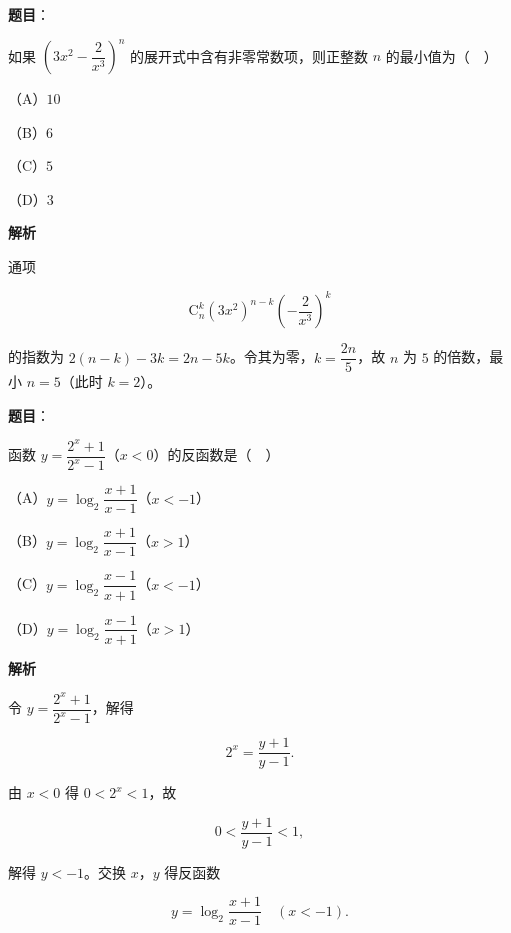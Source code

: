 \begin{answer}

\textbf{题目}：

如果 $\left(3x^2-\dfrac{2}{x^3}\right)^n$ 的展开式中含有非零常数项，则正整数 $n$ 的最小值为（　）

（A）$10$

（B）$6$

（C）$5$

（D）$3$

\textbf{解析}

通项

\nopagebreak[4]
\[\mathrm C_n^k(3x^2)^{n-k}\left(-\frac2{x^3}\right)^k\]

的指数为 $2(n-k)-3k=2n-5k$。令其为零，$k=\dfrac{2n}{5}$，故 $n$ 为 $5$ 的倍数，最小 $n=5$（此时 $k=2$）。


\end{answer}
\begin{answer}

\textbf{题目}：

函数 $y=\dfrac{2^x+1}{2^x-1}$（$x<0$）的反函数是（　）

（A）$y=\log_2\dfrac{x+1}{x-1}$（$x<-1$）

（B）$y=\log_2\dfrac{x+1}{x-1}$（$x>1$）

（C）$y=\log_2\dfrac{x-1}{x+1}$（$x<-1$）

（D）$y=\log_2\dfrac{x-1}{x+1}$（$x>1$）

\textbf{解析}

令 $y=\dfrac{2^x+1}{2^x-1}$，解得

\nopagebreak[4]
\[2^x=\frac{y+1}{y-1}.\]

由 $x<0$ 得 $0<2^x<1$，故

\nopagebreak[4]
\[0<\frac{y+1}{y-1}<1,\]

解得 $y<-1$。交换 $x$，$y$ 得反函数

\nopagebreak[4]
\[y=\log_2\frac{x+1}{x-1}\quad(x<-1).\]


\end{answer}

